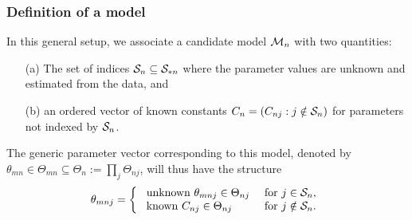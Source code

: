 \documentclass[10pt]{beamer}
\theoremstyle{definition}
\begin{document}
\begin{frame}
\frametitle{Definition of a model}
In this general setup, we associate a candidate model ${\cal{M}}_n$ with two quantities:

\begin{enumerate}
\item[(a)] The set of indices ${\cal{S}}_n \subseteq {\cal{S}}_{* n} $ where the parameter values are unknown and {\colbbf estimated from the data}, and
\item[(b)] an ordered vector of {\colbbf known constants} $C_{n} = (C_{n j}: j \notin {\cal{S}}_n)$ for  parameters not indexed by ${\cal{S}}_n$.
\end{enumerate}
\vspace{1em}

The generic parameter vector corresponding to this model, denoted by $\theta_{m n} \in \Theta_{m n} \subseteq \Theta_{n} := \prod_j \Theta_{n j}$, will thus have the structure
\begin{align*}
\theta_{m n j} = \left\{ \begin{array}{ll}
 \text{ unknown} \ \theta_{ m n j} \in \Theta_{n j} & \text{ for } 
 			j \in {\cal{S}}_n, \\
 \text{ known} \  C_{n j} \in \Theta_{n j} & \text{ for } j \notin {\cal{S}}_n.
\end{array}
\right.
\end{align*}
%

\end{frame}
\end{document}
